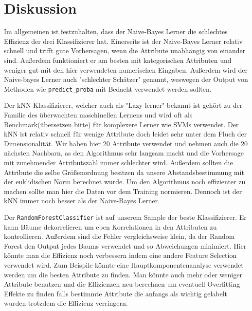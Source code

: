 \section{Diskussion}
\label{sec:discussion}

Im allgemeinen ist festzuhalten, dass der Naive-Bayes Lerner die schlechtes Effizienz der drei Klassifizierer hat.
Einerseits ist der Naive-Bayes Lerner relativ schnell und trifft gute Vorhersagen, wenn die Attribute unabh\"angig von einander sind. Au\ss erdem funktioniert er am besten mit kategorischen Attributen und weniger gut mit den hier verwendeten numerischen Eingaben.
Au\ss erdem wird der Naive-bayes Lerner auch "schlechter Sch\"atzer" genannt, weswegen der Output von Methoden wie \texttt{predict\_proba} mit Bedacht verwendet werden sollten.

Der kNN-Klassifizierer, welcher auch als "Lazy lerner" bekannt ist geh\"ort zu der Familie des \"uberwachten maschinellen Lernens und wird oft als Benchmark(\"ubersetzen bitte) f\"ur komplexere Lerner wie SVMs verwendet.
Der kNN ist relativ schnell f\"ur wenige Attribute doch leidet sehr unter dem Fluch der Dimensionalit\"at. Wir haben hier 20 Attribute verwendet und nehmen auch die 20 n\"achsten Nachbarn, as den Algorithmus sehr langsam macht und die Vorhersage mit zunehmender Attributszahl immer schlechter wird.
Au\ss erdem sollten die Attribute die selbe Gr\"o\ss enordnung besitzen da unsere Abstandsbestimmung mit der euklidischen Norm berechnet wurde. Um den Algorithmus noch effizienter zu machen sollte man hier die Daten vor dem Training normieren. 
Dennoch ist der kNN immer noch besser als der Naive-Bayes Lerner.

Der \texttt{RandomForestClassifier} ist auf unserem Sample der beste Klassifizierer. Er kann B\"aume dekorrelieren um eben Korrelationen in den Attributen zu kontrollieren.
Au\ss erdem sind die Fehler vergleichsweise klein, da der Random Forest den Output jedes Baums verwendet und so Abweichungen minimiert.
Hier k\"onnte man die Effizienz noch verbessern indem eine andere Feature Selection verwendet wird. Zum Beispile k\"onnte eine Hauptkomponentenanalyse verwendet werden um die besten Attribute zu finden. Man k\"onnte auch mehr oder weniger Attribute benutzen und die Effizienzen neu berechnen um eventuell Overfitting Effekte zu finden falls bestimmte Attribute die anfangs als wichtig gelabelt wurden trotzdem die Effizienz verringern.
